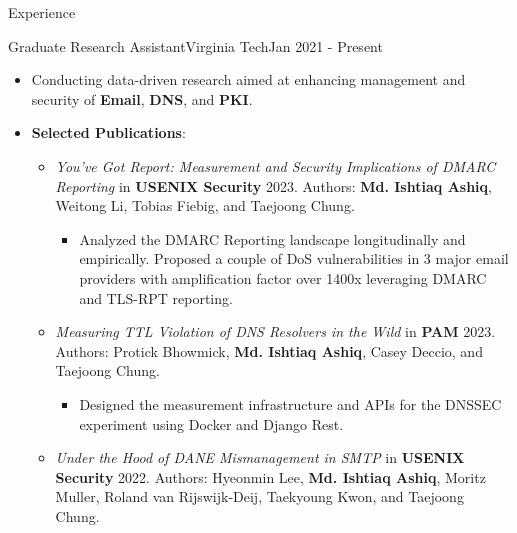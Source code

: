 \documentclass[]{mcdowellcv}
\begin{document}
	\begin{cvsection}{Experience}
		\begin{cvsubsection}{Graduate Research Assistant}{Virginia Tech}{Jan 2021 - Present}
			\begin{itemize}
				\item Conducting data-driven research aimed at enhancing management and security of \textbf{Email}, \textbf{DNS}, and \textbf{PKI}.
				\item \textbf{Selected Publications}:
				\begin{itemize}
					\item \textit{You’ve Got Report: Measurement and Security Implications of DMARC Reporting} in \textbf{USENIX Security} 2023. Authors: \textbf{Md. Ishtiaq Ashiq}, Weitong Li, Tobias Fiebig, and Taejoong Chung. %
					\begin{itemize}
						\item Analyzed the DMARC Reporting landscape longitudinally and empirically. Proposed a couple of DoS vulnerabilities
						in 3 major email providers with amplification factor over 1400x leveraging DMARC and TLS-RPT reporting.
					\end{itemize}
					\item \textit{Measuring TTL Violation of DNS Resolvers in the Wild} in \textbf{PAM} 2023. Authors: Protick Bhowmick, \textbf{Md. Ishtiaq Ashiq}, Casey Deccio, and Taejoong Chung. %
					\begin{itemize}
						\item Designed the measurement infrastructure and APIs for the DNSSEC experiment using Docker and Django Rest.
					\end{itemize}
					\item \textit{Under the Hood of DANE Mismanagement in SMTP} in \textbf{USENIX Security} 2022. Authors: Hyeonmin Lee, \textbf{Md. Ishtiaq Ashiq}, Moritz Muller, Roland van Rijswijk-Deij, Taekyoung Kwon, and Taejoong Chung. %

\end{itemize}
\end{itemize}
\end{cvsubsection}
\end{cvsection}
\end{document}
